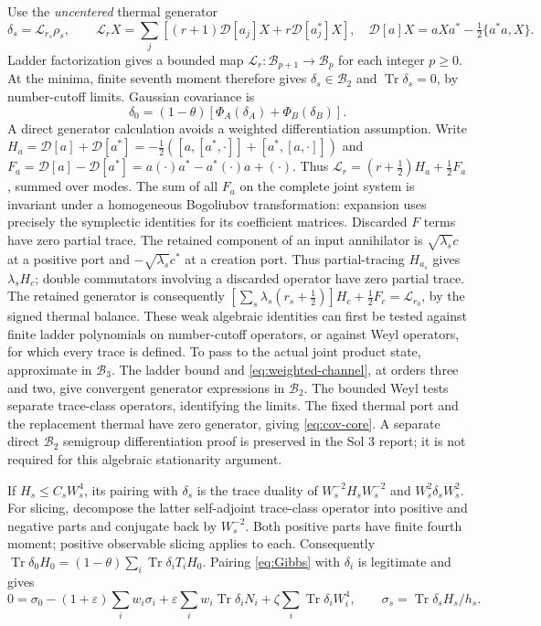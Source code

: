 \documentclass[11pt]{article}
\newcommand{\Tr}{\operatorname{Tr}}
\newcommand{\D}{\mathcal D}
\theoremstyle{remark}\newtheorem{remark}[theorem]{Remark}
\begin{document}
Use the \emph{uncentered} thermal generator
\[
 \delta_s=\mathcal L_{r_s}\rho_s,\qquad
 \mathcal L_rX=\sum_j[(r+1)\D[a_j]X+r\D[a_j^*]X],\quad
 \D[a]X=aXa^*-\tfrac12\{a^*a,X\}.
\]
Ladder factorization gives a bounded map
$\mathcal L_r:\mathcal B_{p+1}\to\mathcal B_p$ for each integer $p\ge0$.
At the minima, finite seventh moment therefore gives
$\delta_s\in\mathcal B_2$ and $\Tr\delta_s=0$, by number-cutoff limits.
Gaussian covariance is
\begin{equation}\label{eq:cov-core}
 \delta_0=(1-\theta)[\Phi_A(\delta_A)+\Phi_B(\delta_B)].
\end{equation}
A direct generator calculation avoids a weighted differentiation assumption.
Write $H_a=\D[a]+\D[a^*]=-\tfrac12([a,[a^*,\cdot]]+[a^*,[a,\cdot]])$
and $F_a=\D[a]-\D[a^*]=a(\cdot)a^*-a^*(\cdot)a+(\cdot)$.
Thus $\mathcal L_r=(r+\tfrac12)H_a+\tfrac12F_a$, summed over modes.
The sum of all $F_a$ on the complete joint system is invariant under a
homogeneous Bogoliubov transformation: expansion uses precisely the
symplectic identities for its coefficient matrices. Discarded $F$ terms
have zero partial trace. The retained component of an input annihilator
is $\sqrt{\lambda_s}c$ at a positive port and
$-\sqrt{\lambda_s}c^*$ at a creation port. Thus partial-tracing $H_{a_s}$
gives $\lambda_s H_c$; double commutators involving a discarded operator
have zero partial trace. The retained generator is consequently
$[\sum_s\lambda_s(r_s+\tfrac12)]H_c+\tfrac12F_c=\mathcal L_{r_0}$,
by the signed thermal balance. These weak algebraic identities can first
be tested against finite ladder polynomials on number-cutoff operators,
or against Weyl operators, for which every trace is defined.
To pass to the actual joint product state, approximate in $\mathcal B_3$.
The ladder bound and \eqref{eq:weighted-channel}, at orders three and two,
give convergent generator expressions in $\mathcal B_2$. The bounded Weyl
tests separate trace-class operators, identifying the limits.
The fixed thermal port and the replacement thermal have zero generator,
giving \eqref{eq:cov-core}. A separate direct $\mathcal B_2$ semigroup
differentiation proof is preserved in the Sol 3 report; it is not required
for this algebraic stationarity argument.

If $H_s\le C_sW_s^4$, its pairing with $\delta_s$ is the trace duality of
$W_s^{-2}H_sW_s^{-2}$ and $W_s^2\delta_sW_s^2$.
For slicing, decompose the latter self-adjoint trace-class operator into
positive and negative parts and conjugate back by $W_s^{-2}$.
Both positive parts have finite fourth moment; positive observable slicing
applies to each. Consequently
$\Tr\delta_0H_0=(1-\theta)\sum_i\Tr\delta_iT_iH_0$.
Pairing \eqref{eq:Gibbs} with $\delta_i$ is legitimate and gives
\begin{equation}\label{eq:station-core}
 0=\sigma_0-(1+\varepsilon)\sum_iw_i\sigma_i
 +\varepsilon\sum_iw_i\Tr\delta_iN_i
 +\zeta\sum_i\Tr\delta_iW_i^4,\qquad
 \sigma_s=\Tr\delta_sH_s/h_s.
\end{equation}
\end{document}
